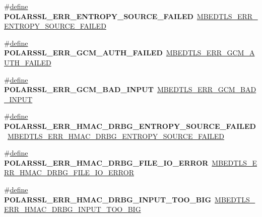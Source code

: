 \begin{DoxyCompactItemize}
\#\hyperlink{structdefine}{define} {\bfseries P\+O\+L\+A\+R\+S\+S\+L\+\_\+\+E\+R\+R\+\_\+\+E\+N\+T\+R\+O\+P\+Y\+\_\+\+S\+O\+U\+R\+C\+E\+\_\+\+F\+A\+I\+L\+ED}~\hyperlink{entropy_8h_af4cd68e9098b27fed32e7d4a48a4048b}{M\+B\+E\+D\+T\+L\+S\+\_\+\+E\+R\+R\+\_\+\+E\+N\+T\+R\+O\+P\+Y\+\_\+\+S\+O\+U\+R\+C\+E\+\_\+\+F\+A\+I\+L\+ED}
\item 
\mbox{\label{compat-1_83_8h_a489a0823c71a0855d61f649bd1c7f4b0}} 
\#\hyperlink{structdefine}{define} {\bfseries P\+O\+L\+A\+R\+S\+S\+L\+\_\+\+E\+R\+R\+\_\+\+G\+C\+M\+\_\+\+A\+U\+T\+H\+\_\+\+F\+A\+I\+L\+ED}~\hyperlink{gcm_8h_a4ed179bbaac5f312fb1235d33db3f6c4}{M\+B\+E\+D\+T\+L\+S\+\_\+\+E\+R\+R\+\_\+\+G\+C\+M\+\_\+\+A\+U\+T\+H\+\_\+\+F\+A\+I\+L\+ED}
\item 
\mbox{\label{compat-1_83_8h_a5dccf47b81f81ee37869f170613e8a91}} 
\#\hyperlink{structdefine}{define} {\bfseries P\+O\+L\+A\+R\+S\+S\+L\+\_\+\+E\+R\+R\+\_\+\+G\+C\+M\+\_\+\+B\+A\+D\+\_\+\+I\+N\+P\+UT}~\hyperlink{gcm_8h_a77153ba10a2c9d428bdb1fb02076429e}{M\+B\+E\+D\+T\+L\+S\+\_\+\+E\+R\+R\+\_\+\+G\+C\+M\+\_\+\+B\+A\+D\+\_\+\+I\+N\+P\+UT}
\item 
\mbox{\label{compat-1_83_8h_a0d9472d39e70c4eeb3cb06177c3012f8}} 
\#\hyperlink{structdefine}{define} {\bfseries P\+O\+L\+A\+R\+S\+S\+L\+\_\+\+E\+R\+R\+\_\+\+H\+M\+A\+C\+\_\+\+D\+R\+B\+G\+\_\+\+E\+N\+T\+R\+O\+P\+Y\+\_\+\+S\+O\+U\+R\+C\+E\+\_\+\+F\+A\+I\+L\+ED}~\hyperlink{hmac__drbg_8h_ac384cdd999b9733a5e4a8112c4f14291}{M\+B\+E\+D\+T\+L\+S\+\_\+\+E\+R\+R\+\_\+\+H\+M\+A\+C\+\_\+\+D\+R\+B\+G\+\_\+\+E\+N\+T\+R\+O\+P\+Y\+\_\+\+S\+O\+U\+R\+C\+E\+\_\+\+F\+A\+I\+L\+ED}
\item 
\mbox{\label{compat-1_83_8h_a6a560c35edcfca2ab71f39e2c70d50c8}} 
\#\hyperlink{structdefine}{define} {\bfseries P\+O\+L\+A\+R\+S\+S\+L\+\_\+\+E\+R\+R\+\_\+\+H\+M\+A\+C\+\_\+\+D\+R\+B\+G\+\_\+\+F\+I\+L\+E\+\_\+\+I\+O\+\_\+\+E\+R\+R\+OR}~\hyperlink{hmac__drbg_8h_ae5ccb23af2f8faf60deb292208af66f7}{M\+B\+E\+D\+T\+L\+S\+\_\+\+E\+R\+R\+\_\+\+H\+M\+A\+C\+\_\+\+D\+R\+B\+G\+\_\+\+F\+I\+L\+E\+\_\+\+I\+O\+\_\+\+E\+R\+R\+OR}
\item 
\mbox{\label{compat-1_83_8h_a63ba4f9a4e98f5d1af93e33c3e1fe3b5}} 
\#\hyperlink{structdefine}{define} {\bfseries P\+O\+L\+A\+R\+S\+S\+L\+\_\+\+E\+R\+R\+\_\+\+H\+M\+A\+C\+\_\+\+D\+R\+B\+G\+\_\+\+I\+N\+P\+U\+T\+\_\+\+T\+O\+O\+\_\+\+B\+IG}~\hyperlink{hmac__drbg_8h_a0afd76b63cb8715577ba44de755af1fe}{M\+B\+E\+D\+T\+L\+S\+\_\+\+E\+R\+R\+\_\+\+H\+M\+A\+C\+\_\+\+D\+R\+B\+G\+\_\+\+I\+N\+P\+U\+T\+\_\+\+T\+O\+O\+\_\+\+B\+IG}

\end{DoxyCompactItemize}
